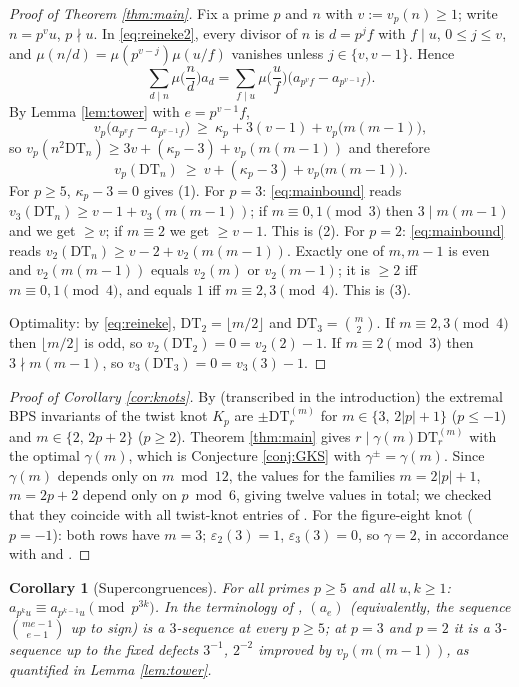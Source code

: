 \documentclass[11pt]{amsart}
\newtheorem{corollary}[theorem]{Corollary}
\theoremstyle{definition}
\newcommand{\DT}{\mathrm{DT}}
\newcommand{\vp}{v_p}
\begin{document}
\begin{proof}[Proof of Theorem \ref{thm:main}]
Fix a prime $p$ and $n$ with $v:=\vp(n)\ge1$; write $n=p^vu$, $p\nmid u$. In \eqref{eq:reineke2}, every divisor of $n$ is $d=p^jf$ with $f\mid u$, $0\le j\le v$, and $\mu(n/d)=\mu(p^{v-j})\mu(u/f)$ vanishes unless $j\in\{v,v-1\}$. Hence
\[
\sum_{d\mid n}\mu\Big(\frac nd\Big)a_d=\sum_{f\mid u}\mu\Big(\frac uf\Big)\Big(a_{p^vf}-a_{p^{v-1}f}\Big).
\]
By Lemma \ref{lem:tower} with $e=p^{v-1}f$,
\[
\vp\big(a_{p^vf}-a_{p^{v-1}f}\big)\ \ge\ \kappa_p+3(v-1)+\vp\big(m(m-1)\big),
\]
so $\vp(n^2\DT_n)\ge 3v+(\kappa_p-3)+\vp(m(m-1))$ and therefore
\begin{equation}\label{eq:mainbound}
\vp(\DT_n)\ \ge\ v+(\kappa_p-3)+\vp\big(m(m-1)\big).
\end{equation}
For $p\ge5$, $\kappa_p-3=0$ gives (1). For $p=3$: \eqref{eq:mainbound} reads $v_3(\DT_n)\ge v-1+v_3(m(m-1))$; if $m\equiv0,1\pmod 3$ then $3\mid m(m-1)$ and we get $\ge v$; if $m\equiv2$ we get $\ge v-1$. This is (2). For $p=2$: \eqref{eq:mainbound} reads $v_2(\DT_n)\ge v-2+v_2(m(m-1))$. Exactly one of $m,m-1$ is even and $v_2(m(m-1))$ equals $v_2(m)$ or $v_2(m-1)$; it is $\ge2$ iff $m\equiv0,1\pmod4$, and equals $1$ iff $m\equiv2,3\pmod4$. This is (3).

Optimality: by \eqref{eq:reineke},
$\DT_2=\lfloor m/2\rfloor$ and $\DT_3=\binom m2$. If $m\equiv2,3\pmod4$ then $\lfloor m/2\rfloor$ is odd, so $v_2(\DT_2)=0=v_2(2)-1$. If $m\equiv2\pmod3$ then $3\nmid m(m-1)$, so $v_3(\DT_3)=0=v_3(3)-1$.
\end{proof}

\begin{proof}[Proof of Corollary \ref{cor:knots}]
By \cite[Prop.~1.2]{GKS} (transcribed in the introduction) the extremal BPS invariants of the twist knot $K_p$ are $\pm\DT^{(m)}_r$ for $m\in\{3,\,2|p|+1\}$ ($p\le-1$) and $m\in\{2,\,2p+2\}$ ($p\ge2$). Theorem \ref{thm:main} gives $r\mid\gamma(m)\DT^{(m)}_r$ with the optimal $\gamma(m)$, which is Conjecture \ref{conj:GKS} with $\gamma^\pm=\gamma(m)$. Since $\gamma(m)$ depends only on $m\bmod 12$, the values for the families $m=2|p|+1$, $m=2p+2$ depend only on $p\bmod 6$, giving twelve values in total; we checked that they coincide with all twist-knot entries of \cite[Table~1]{GKS}. For the figure-eight knot ($p=-1$): both rows have $m=3$; $\varepsilon_2(3)=1$, $\varepsilon_3(3)=0$, so $\gamma=2$, in accordance with \cite[Table 2]{GKS} and \cite{BCM}.
\end{proof}

\begin{corollary}[Supercongruences]\label{cor:tower}
For all primes $p\ge5$ and all $u,k\ge1$: $a_{p^ku}\equiv a_{p^{k-1}u}\pmod{p^{3k}}$. In the terminology of \cite{AZ,SVW,Muller}, $(a_e)$ (equivalently, the sequence $\binom{me-1}{e-1}$ up to sign) is a $3$-sequence at every $p\ge5$; at $p=3$ and $p=2$ it is a $3$-sequence up to the fixed defects $3^{-1}$, $2^{-2}$ improved by $\vp(m(m-1))$, as quantified in Lemma \ref{lem:tower}.
\end{corollary}
\end{document}

